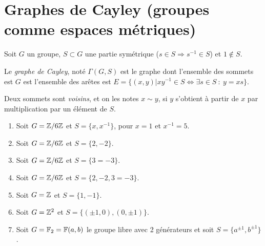 
\chapter{Graphes de Cayley (groupes comme espaces métriques)}
\label{sec:graphes-de-Cayley}

  Soit $G$ un groupe, $S \subset G$ une partie symétrique ($s \in S \Rightarrow s^{-1} \in S$) et $1 \notin
  S$.

  \begin{defi} 
    Le \emph{graphe de Cayley}, noté $\Gamma(G, S)$ est le graphe dont l'ensemble des sommets est $G$ est
    l'ensemble des arêtes est $E = \{(x,y) | xy^{-1} \in S \iff \exists s \in S\ :\ y = xs\}$.

    Deux sommets sont \emph{voisins}, et on les notes $x \sim y$, si $y$ s'obtient à partir de $x$ par
    multiplication par un élément de $S$.
  \end{defi}

  \begin{exs}
    \begin{enumerate}
    \item Soit $G = \mathbb{Z}/6\mathbb{Z}$ et $S = \{x, x^{-1}\}$, pour $x = 1$ et $x^{-1} = 5$.

    \item Soit $G = \mathbb{Z}/6\mathbb{Z}$ et $S = \{2, -2\}$.

    \item Soit $G = \mathbb{Z}/6\mathbb{Z}$ et $S = \{3 = -3\}$.

    \item Soit $G = \mathbb{Z}/6\mathbb{Z}$ et $S = \{2, -2, 3 = -3\}$.

    \item Soit $G = \mathbb{Z}$ et $S = \{1, -1\}$.

    \item Soit $G = \mathbb{Z}^2$ et $S = \{(\pm 1, 0), (0, \pm 1)\}$.

    \item Soit $G = \mathbb{F}_2 = \mathbb{F}(a,b)$ le groupe libre avec 2 générateurs et soit $S = \{a^{\pm 1}, b^{\pm 1}\}$.
    \end{enumerate}
  \end{exs}

